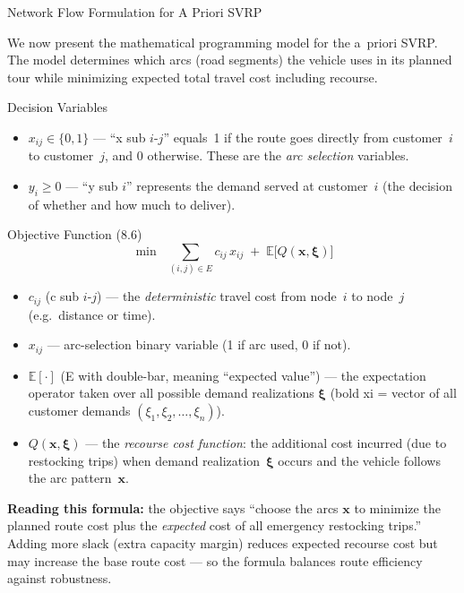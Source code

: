 \documentclass[aspectratio=169,10pt]{beamer}
\begin{document}
\begin{frame}[allowframebreaks]{Network Flow Formulation for A Priori SVRP}

  We now present the mathematical programming model for the a~priori SVRP.
  The model determines which arcs (road segments) the vehicle uses in its
  planned tour while minimizing expected total travel cost including recourse.

  \begin{block}{Decision Variables}
    \begin{itemize}
      \item $x_{ij} \in \{0,1\}$ --- ``x sub $i$-$j$'' equals~1 if the route
            goes directly from customer~$i$ to customer~$j$, and 0 otherwise.
            These are the \emph{arc selection} variables.
      \item $y_i \geq 0$ --- ``y sub $i$'' represents the demand served at
            customer~$i$ (the decision of whether and how much to deliver).
    \end{itemize}
  \end{block}

  \framebreak

  \begin{block}{Objective Function (8.6)}
    \[
      \min\;\; \sum_{(i,j)\in E} c_{ij}\, x_{ij}
      \;+\; \mathbb{E}\bigl[Q(\mathbf{x}, \boldsymbol{\xi})\bigr]
      \tag{8.6}
    \]
    \begin{itemize}
      \item $c_{ij}$ (c sub $i$-$j$) --- the \emph{deterministic} travel cost
            from node~$i$ to node~$j$ (e.g.\ distance or time).
      \item $x_{ij}$ --- arc-selection binary variable (1 if arc used, 0 if not).
      \item $\mathbb{E}[\cdot]$ (E with double-bar, meaning ``expected value'')
            --- the expectation operator taken over all possible demand
            realizations $\boldsymbol{\xi}$ (bold xi = vector of all customer
            demands $(\xi_1, \xi_2, \ldots, \xi_n)$).
      \item $Q(\mathbf{x}, \boldsymbol{\xi})$ --- the \emph{recourse cost
            function}: the additional cost incurred (due to restocking trips)
            when demand realization~$\boldsymbol{\xi}$ occurs and the vehicle
            follows the arc pattern~$\mathbf{x}$.
    \end{itemize}
    \textbf{Reading this formula:} the objective says ``choose the arcs
    $\mathbf{x}$ to minimize the planned route cost plus the \emph{expected}
    cost of all emergency restocking trips.''
    Adding more slack (extra capacity margin) reduces expected recourse cost
    but may increase the base route cost --- so the formula balances route
    efficiency against robustness.
  \end{block}


\end{frame}
\end{document}
